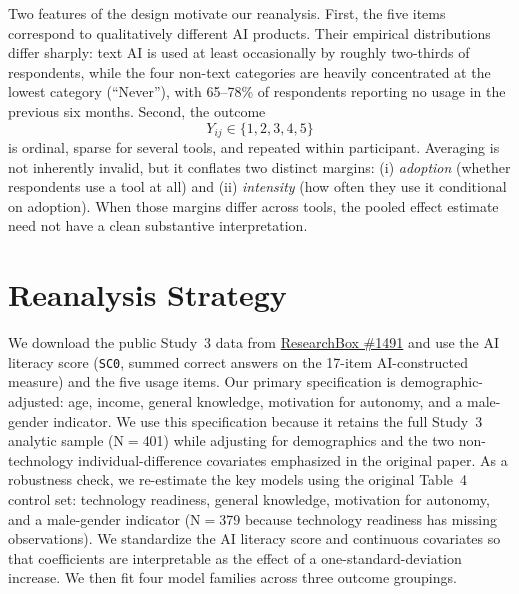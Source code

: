 \documentclass[11pt]{article}
\begin{document}
Two features of the design motivate our reanalysis. First, the five items
correspond to qualitatively different AI products. Their empirical
distributions differ sharply: text AI is used at least occasionally by roughly
two-thirds of respondents, while the four non-text categories are heavily
concentrated at the lowest category (``Never''), with 65--78\% of respondents
reporting no usage in the previous six months. Second, the
outcome
\[
Y_{ij} \in \{1, 2, 3, 4, 5\}
\]
is ordinal, sparse for several tools, and repeated within participant.
Averaging is not inherently invalid, but it conflates two distinct margins:
(i) \emph{adoption} (whether respondents use a tool at all) and
(ii) \emph{intensity} (how often they use it conditional on adoption). When
those margins differ across tools, the pooled effect estimate need not have a
clean substantive interpretation.

\section{Reanalysis Strategy}

We download the public Study~3 data from
\href{https://researchbox.org/1491}{ResearchBox \#1491} and use the AI
literacy score (\texttt{SC0}, summed correct answers on the 17-item
AI-constructed measure) and the five usage items. Our primary specification is
demographic-adjusted: age, income, general knowledge, motivation for autonomy,
and a male-gender indicator. We use this specification because it retains the
full Study~3 analytic sample (N$=$401) while adjusting for demographics and the
two non-technology individual-difference covariates emphasized in the original
paper. As a robustness check, we re-estimate the key models using the original
Table~4 control set: technology readiness, general knowledge, motivation for
autonomy, and a male-gender indicator (N$=$379 because technology readiness has
missing observations). We standardize the AI literacy score and continuous
covariates so that coefficients are interpretable as the effect of a
one-standard-deviation increase. We then fit four model families across three
outcome groupings.
\end{document}
